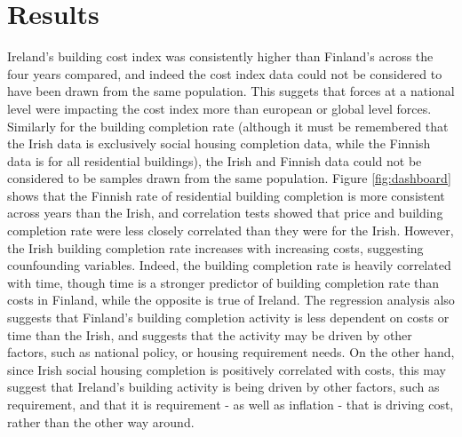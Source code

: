 \documentclass[hidelinks,12pt,oneside]{report} %
\begin{document}
\chapter{Results}
Ireland's building cost index was consistently higher than Finland's across the four years compared, and indeed the cost index data could not be considered to have been drawn from the same population. This suggets that forces at a national level were impacting the cost index more than european or global level forces. Similarly for the building completion rate (although it must be remembered that the Irish data is exclusively social housing completion data, while the Finnish data is for all residential buildings), the Irish and Finnish data could not be considered to be samples drawn from the same population. Figure \ref{fig:dashboard} shows that the Finnish rate of residential building completion is more consistent across years than the Irish, and correlation tests showed that price and building completion rate were less closely correlated than they were for the Irish. However, the Irish building completion rate increases with increasing costs, suggesting counfounding variables. Indeed, the building completion rate is heavily correlated with time, though time is a stronger predictor of building completion rate than costs in Finland, while the opposite is true of Ireland. The regression analysis also suggests that Finland's building completion activity is less dependent on costs or time than the Irish, and suggests that the activity may be driven by other factors, such as national policy, or housing requirement needs. On the other hand, since Irish social housing completion is positively correlated with costs, this may suggest that Ireland's building activity is being driven by other factors, such as requirement, and that it is requirement - as well as inflation - that is driving cost, rather than the other way around.
\end{document}
